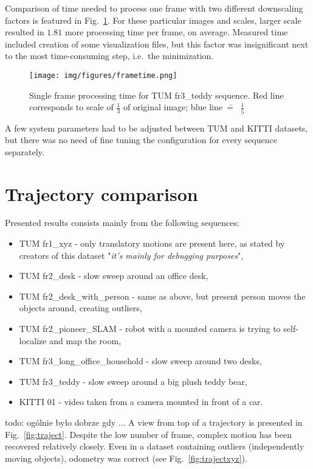 Comparison of time needed to process one frame with two different downscaling factors is featured in Fig.~\ref{fig:timing}. For these particular images and scales, larger scale resulted in $1.81$ more processing time per frame, on average. Measured time included creation of some visualization files, but this factor was insignificant next to the most time-consuming step, i.e.~the minimization.

\begin{figure}[ht]
	\centering\texttt{[image: img/figures/frametime.png]}
	\caption{ Single frame processing time for TUM fr3\_teddy sequence. Red line corresponds to scale of $\frac{1}{3}$ of original image; blue line~\==~ $\frac{1}{5}$ }
	\label{fig:timing}
\end{figure}


A few system parameters had to be adjusted between TUM and KITTI datasets, but there was no need of fine tuning the configuration for every sequence separately.

\section{Trajectory comparison}

Presented results consists mainly from the following sequences:
\begin{itemize}
	\item TUM fr1\_xyz - only translatory motions are present here, as stated by creators of this dataset "\textit{it's mainly for debugging purposes}",
	\item TUM fr2\_desk - slow sweep around an office desk,
	\item TUM fr2\_desk\_with\_person - same as above, but present person moves the objects around, creating outliers,
	\item TUM fr2\_pioneer\_SLAM - robot with a mounted camera is trying to self-localize and map the room,
	\item TUM fr3\_long\_office\_household - slow sweep around two desks,
	\item TUM fr3\_teddy - slow sweep around a big plush teddy bear,
	\item KITTI 01 - video taken from a camera mounted in front of a car.
\end{itemize}

todo: ogólnie było dobrze gdy ... A view from top of a trajectory is presented in Fig.~\ref{fig:traject}. Despite the low number of frame, complex motion has been recovered relatively closely. Even in a dataset containing outliers (independently moving objects), odometry was correct (see Fig.~\ref{fig:trajectxyz}).

